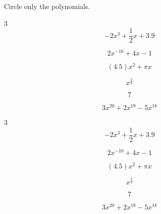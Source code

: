 \begin{Exercise}[title={Identifying Polynomials}, label=findpolynomials]
    Circle only the polynomials.
\begin{multicols}{3}
  \begin{equation*}
    -2 x^3 + \frac{1}{2}x + 3.9
  \end{equation*}

  \begin{equation*}
    2 x^{-10} + 4x - 1
  \end{equation*}
  
  \begin{equation*}
    (4.5)x^2 + \pi x
  \end{equation*}
  
  \begin{equation*}
    x^{\frac{2}{3}}
  \end{equation*}
  
  \begin{equation*}
   7
  \end{equation*}

  \begin{equation*}
    3x^{20} + 2x^{19} -5 x^{18}
  \end{equation*}
\end{multicols}
\end{Exercise}

\begin{Answer}[ref=findpolynomials]
\begin{multicols}{3}
  \begin{equation*}
    \boxed{-2 x^3 + \frac{1}{2}x + 3.9}
  \end{equation*}

  \begin{equation*}
    2 x^{-10} + 4x - 1
  \end{equation*}

  \begin{equation*}
    \boxed{(4.5)x^2 + \pi x}
  \end{equation*}

  \begin{equation*}
    x^{\frac{2}{3}}
  \end{equation*}

  \begin{equation*}
   \boxed{7}
  \end{equation*}

  \begin{equation*}
    \boxed{3x^{20} + 2x^{19} -5 x^{18}}
  \end{equation*}
\end{multicols}

\end{Answer}

